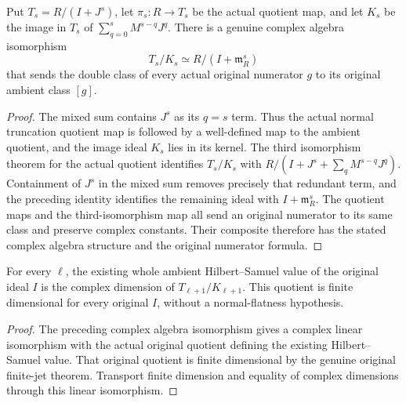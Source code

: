 \begin{theorem}
\label{hir:relative-normal-original-ambient-mixed-truncation-quotient}
\leanok
Put $T_s=R/(I+J^s)$, let $\pi_s:R\to T_s$ be the actual quotient map,
and let $K_s$ be the image in $T_s$ of
$\sum_{q=0}^s M^{s-q}J^q$. There is a genuine complex algebra isomorphism
\[
 T_s/K_s\simeq R/(I+\mathfrak m_R^s)
\]
that sends the double class of every actual original numerator $g$
to its original ambient class $[g]$.
\end{theorem}
\begin{proof}
The mixed sum contains $J^s$ as its $q=s$ term. Thus the actual normal
truncation quotient map is followed by a well-defined map to the
ambient quotient, and the image ideal $K_s$ lies in its kernel.
The third isomorphism theorem for the actual quotient identifies
$T_s/K_s$ with $R/(I+J^s+\sum_q M^{s-q}J^q)$. Containment of $J^s$
in the mixed sum removes precisely that redundant term, and the
preceding identity identifies the remaining ideal with
$I+\mathfrak m_R^s$. The quotient maps and the third-isomorphism map
all send an original numerator to its same class and preserve
complex constants. Their composite therefore has the stated
complex algebra structure and the original numerator formula.
\end{proof}

\begin{corollary}
\label{hir:relative-normal-original-ambient-mixed-hilbert-samuel}
\leanok
For every $\ell$, the existing whole ambient Hilbert--Samuel value
of the original ideal $I$ is the complex dimension of
$T_{\ell+1}/K_{\ell+1}$. This quotient is finite dimensional for every
original $I$, without a normal-flatness hypothesis.
\end{corollary}
\begin{proof}
The preceding complex algebra isomorphism gives a complex linear
isomorphism with the actual original quotient defining the existing
Hilbert--Samuel value. That original quotient is finite dimensional
by the genuine original finite-jet theorem. Transport finite dimension
and equality of complex dimensions through this linear isomorphism.
\end{proof}

